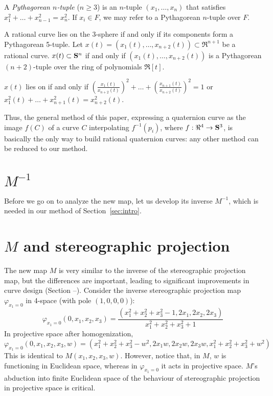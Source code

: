 \begin{defn2}
{\rm 
A {\em Pythagorean $n$-tuple} ($n \geq 3$) is an $n$-tuple 
$(x_1,\ldots,x_n)$ that satisfies\\
$x_1^2 + \ldots + x_{n-1}^2 = x_{n}^2$.
If $x_i \in F$, we may refer to a Pythagorean $n$-tuple over $F$.
}
\end{defn2}

\begin{lemma}
A rational curve lies on the 3-sphere if and only if its components
form a Pythagorean 5-tuple.
Let $x(t) = (x_1(t),\ldots,x_{n+2}(t)) \subset \Re^{n+1}$
be a rational curve.
$x(t) \subset \mbox{{\bf S}$^{n}$}$ if and only if $(x_1(t),\ldots,x_{n+2}(t))$ is a Pythagorean
$(n+2)$-tuple over the ring of polynomials $\Re[t]$.
\end{lemma}
\prf
$x(t)$ lies on  if and only if
$(\frac{x_1(t)}{x_{n+2}(t)})^2 + \ldots 
	+ (\frac{x_{n+1}(t)}{x_{n+2}(t)})^2 = 1$
or
$x_1^2(t) + \ldots + x_{n+1}^2(t) = x_{n+2}^2(t)$.
\QED

Thus, the general method of this paper,
expressing a quaternion curve as the image $f(C)$ of a curve $C$
interpolating $f^{-1}(p_i)$, where $f:\Re^4 \rightarrow \mbox{{\bf S}$^{3}$}$,
is basically the only way to build rational quaternion curves:
any other method can be reduced to our method.


\section{$M^{-1}$}

Before we go on to analyze the new map, let us develop its inverse $M^{-1}$,
which is needed in our method of Section~\ref{sec:intro}.


\section{$M$ and stereographic projection}

The new map $M$ is very similar to the inverse of the stereographic projection map,
but the differences are important, leading to significant improvements
in curve design (Section --).
Consider the inverse stereographic projection map $\varphi_{x_1=0}$ in 4-space
(with pole $(1,0,0,0)$):
\[
	\varphi_{x_1=0} (0,x_1,x_2,x_3) =
	\frac{(x_1^2 + x_2^2 + x_3^2 - 1, 2x_1,2x_2,2x_3)}
	     {x_1^2 + x_2^2 + x_3^2 + 1}
\]
In projective space after homogenization,
\[
	\varphi_{x_1=0} (0,x_1,x_2,x_3,w) =
	(x_1^2 + x_2^2 + x_3^2 - w^2,
	 2x_1w,2x_2 w,2x_3 w,
	x_1^2 + x_2^2 + x_3^2 + w^2)
\]
This is identical to $M(x_1,x_2,x_3,w)$.
However, notice that, in $M$, $w$ is functioning in Euclidean space,
whereas in $\varphi_{x_1=0}$ it acts in projective space.
$M$'s abduction into finite Euclidean space of the behaviour of stereographic 
projection in projective space is critical.

